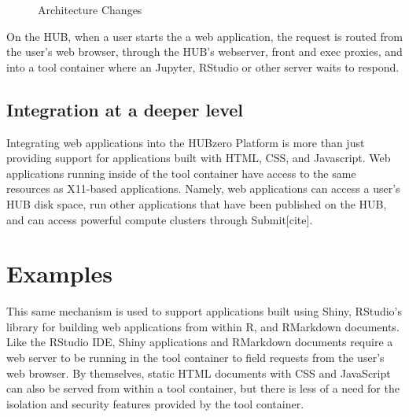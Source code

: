 \documentclass[conference]{../sty/IEEEtran}
\begin{document}
\begin{figure}[!h]
	\centering
	\caption{Architecture Changes}
	\label{fig_sim}
\end{figure}

On the HUB, when a user starts the a web application, the request is routed
from the user's web browser, through the HUB's webserver, front and exec
proxies, and into a tool container where an Jupyter, RStudio or other server
waits to respond.

\subsection{Integration at a deeper level}

Integrating web applications into the HUBzero Platform is more than just providing support for applications built with HTML, CSS, and Javascript. Web applications running inside of the tool container have access to the same resources as X11-based applications. Namely, web applications can access a user's HUB disk space, run other applications that have been published on the HUB, and can access powerful compute clusters through Submit[cite].

\section {Examples}

This same mechanism is used to support applications built using Shiny,
RStudio's library for building web applications from within R, and RMarkdown
documents. Like the RStudio IDE, Shiny applications and RMarkdown documents
require a web server to be running in the tool container to field requests from
the user's web browser. By themselves, static HTML documents with CSS and JavaScript
can also be served from within a tool container, but there is less of a need
for the isolation and security features provided by the tool container.
\end{document}
